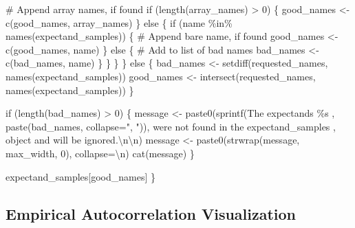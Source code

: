 \documentclass[
  letterpaper,
  DIV=11,
  numbers=noendperiod]{scrartcl}
\newenvironment{Shaded}{\begin{snugshade}}{\end{snugshade}}
\newcommand{\CharTok}[1]{\textcolor[rgb]{0.13,0.47,0.30}{#1}}
\newcommand{\CommentTok}[1]{\textcolor[rgb]{0.37,0.37,0.37}{#1}}
\newcommand{\ControlFlowTok}[1]{\textcolor[rgb]{0.00,0.23,0.31}{#1}}
\newcommand{\DecValTok}[1]{\textcolor[rgb]{0.68,0.00,0.00}{#1}}
\newcommand{\KeywordTok}[1]{\textcolor[rgb]{0.00,0.23,0.31}{#1}}
\newcommand{\NormalTok}[1]{\textcolor[rgb]{0.00,0.23,0.31}{#1}}
\newcommand{\OperatorTok}[1]{\textcolor[rgb]{0.37,0.37,0.37}{#1}}
\newcommand{\SpecialCharTok}[1]{\textcolor[rgb]{0.37,0.37,0.37}{#1}}
\newcommand{\StringTok}[1]{\textcolor[rgb]{0.13,0.47,0.30}{#1}}
\begin{document}
\begin{Shaded}
\begin{Highlighting}[]
      \CommentTok{\# Append array names, if found}
      \ControlFlowTok{if}\NormalTok{ (length(array\_names) }\OperatorTok{\textgreater{}} \DecValTok{0}\NormalTok{) \{}
\NormalTok{        good\_names }\OperatorTok{\textless{}{-}}\NormalTok{ c(good\_names, array\_names)}
\NormalTok{      \} }\ControlFlowTok{else}\NormalTok{ \{}
        \ControlFlowTok{if}\NormalTok{ (name }\OperatorTok{\%}\KeywordTok{in}\OperatorTok{\%}\NormalTok{ names(expectand\_samples)) \{}
          \CommentTok{\# Append bare name, if found}
\NormalTok{          good\_names }\OperatorTok{\textless{}{-}}\NormalTok{ c(good\_names, name)}
\NormalTok{        \}  }\ControlFlowTok{else}\NormalTok{ \{}
          \CommentTok{\# Add to list of bad names}
\NormalTok{          bad\_names }\OperatorTok{\textless{}{-}}\NormalTok{ c(bad\_names, name)}
\NormalTok{        \}}
\NormalTok{      \}}
\NormalTok{    \}}
\NormalTok{  \} }\ControlFlowTok{else}\NormalTok{ \{}
\NormalTok{    bad\_names }\OperatorTok{\textless{}{-}}\NormalTok{ setdiff(requested\_names, names(expectand\_samples))}
\NormalTok{    good\_names }\OperatorTok{\textless{}{-}}\NormalTok{ intersect(requested\_names, names(expectand\_samples))}
\NormalTok{  \}}
    
  \ControlFlowTok{if}\NormalTok{ (length(bad\_names) }\OperatorTok{\textgreater{}} \DecValTok{0}\NormalTok{) \{}
\NormalTok{    message }\OperatorTok{\textless{}{-}}\NormalTok{ paste0(sprintf(}\StringTok{\textquotesingle{}The expectands }\SpecialCharTok{\%s}\StringTok{ \textquotesingle{}}\NormalTok{,}
\NormalTok{                              paste(bad\_names, collapse}\OperatorTok{=}\StringTok{", "}\NormalTok{)),}
                      \StringTok{\textquotesingle{}were not found in the \textasciigrave{}expectand\_samples\textasciigrave{} \textquotesingle{}}\NormalTok{,}
                      \StringTok{\textquotesingle{}object and will be ignored.}\CharTok{\textbackslash{}n\textbackslash{}n}\StringTok{\textquotesingle{}}\NormalTok{)}
\NormalTok{    message }\OperatorTok{\textless{}{-}}\NormalTok{ paste0(strwrap(message, max\_width, }\DecValTok{0}\NormalTok{), collapse}\OperatorTok{=}\StringTok{\textquotesingle{}}\CharTok{\textbackslash{}n}\StringTok{\textquotesingle{}}\NormalTok{)}
\NormalTok{    cat(message)}
\NormalTok{  \}}
  
\NormalTok{  expectand\_samples[good\_names]}
\NormalTok{\}}
\end{Highlighting}
\end{Shaded}

\subsection{Empirical Autocorrelation
Visualization}\label{empirical-autocorrelation-visualization}
\end{document}
